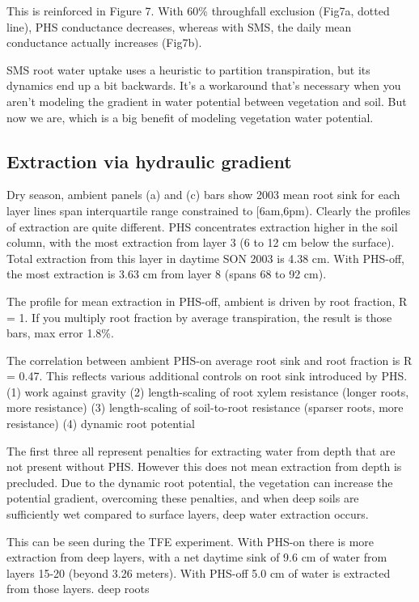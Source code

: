 \documentclass[draft,linenumbers]{agujournal}
\begin{document}
This is reinforced in Figure 7. With 60\% throughfall exclusion (Fig7a, dotted line), PHS conductance decreases, whereas with SMS, the daily mean conductance actually increases (Fig7b).

SMS root water uptake uses a heuristic to partition transpiration, but its dynamics end up a bit backwards. It's a workaround that's necessary when you aren't modeling the gradient in water potential between vegetation and soil. But now we are, which is a big benefit of modeling vegetation water potential.


\subsection{Extraction via hydraulic gradient}

Dry season, ambient panels (a) and (c)
bars show 2003 mean root sink for each layer
lines span interquartile range
constrained to [6am,6pm).
Clearly the profiles of extraction are quite different.
PHS concentrates extraction higher in the soil column, with the most extraction from layer 3 (6 to 12 cm below the surface).
Total extraction from this layer in daytime SON 2003 is 4.38 cm.
With PHS-off, the most extraction is 3.63 cm from layer 8 (spans 68 to 92 cm).

The profile for mean extraction in PHS-off, ambient is driven by root fraction, R = 1.
If you multiply root fraction by average transpiration, the result is those bars, max error 1.8\%.

The correlation between ambient PHS-on average root sink and root fraction is R = 0.47.
This reflects various additional controls on root sink introduced by PHS.
(1) work against gravity
(2) length-scaling of root xylem resistance (longer roots, more resistance)
(3) length-scaling of soil-to-root resistance (sparser roots, more resistance)
(4) dynamic root potential

The first three all represent penalties for extracting water from depth that are not present without PHS.
However this does not mean extraction from depth is precluded.
Due to the dynamic root potential, the vegetation can increase the potential gradient, overcoming these penalties,  
and when deep soils are sufficiently wet compared to surface layers, deep water extraction occurs.

This can be seen during the TFE experiment. With PHS-on there is more extraction from deep layers, 
with a net daytime sink of 9.6 cm of water from layers 15-20 (beyond 3.26 meters). 
With PHS-off  5.0 cm of water is extracted from those layers.
deep roots \citep{nepstad1994}
\end{document}
